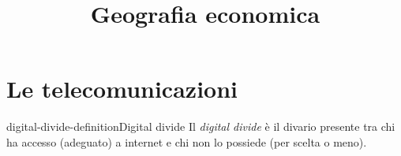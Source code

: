 \documentclass[preview]{standalone}
\begin{document}
\title{Geografia economica}
\genpage

\section{Le telecomunicazioni}

\begin{snippetdefinition}{digital-divide-definition}{Digital divide}
    Il \textit{digital divide} è il divario presente tra chi ha accesso
    (adeguato) a internet e chi non lo possiede (per
    scelta o meno).
\end{snippetdefinition}

\end{document}
